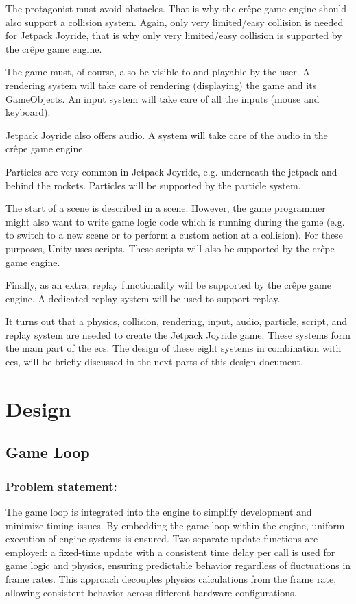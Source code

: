 \documentclass{projdoc}
\begin{document}
The protagonist must avoid obstacles. That is why the cr\^epe game engine should also
support a collision system. Again, only very limited/easy collision is needed for
Jetpack Joyride, that is why only very limited/easy collision is supported by the
cr\^epe game engine.

The game must, of course, also be visible to and playable by the user. A rendering
system will take care of rendering (displaying) the game and its GameObjects. An
input system will take care of all the inputs (mouse and keyboard).

Jetpack Joyride also offers audio. A system will take care of the audio in the
cr\^epe game engine.

Particles are very common in Jetpack Joyride, e.g. underneath the jetpack and behind
the rockets. Particles will be supported by the particle system.

The start of a scene is described in a scene. However, the game programmer might also
want to write game logic code which is running during the game (e.g. to switch to a
new scene or to perform a custom action at a collision). For these purposes, Unity
uses scripts. These scripts will also be supported by the cr\^epe game engine.

Finally, as an extra, replay functionality will be supported by the cr\^epe game
engine. A dedicated replay system will be used to support replay.

It turns out that a physics, collision, rendering, input, audio, particle, script,
and replay system are needed to create the Jetpack Joyride game. These systems form
the main part of the \gls{ecs}. The design of these eight systems in combination with
\gls{ecs}, will be briefly discussed in the next parts of this design document.

\section{Design}
\subsection{Game Loop}
\subsubsection{Problem statement:}
The game loop is integrated into the engine to simplify development and minimize timing issues. By embedding the game loop within the engine, uniform execution of engine systems is ensured.
Two separate update functions are employed: a fixed-time update with a consistent time delay per call is used for game logic and physics, ensuring predictable behavior regardless of fluctuations in frame rates.
This approach decouples physics calculations from the frame rate, allowing consistent behavior across different hardware configurations.
\end{document}
